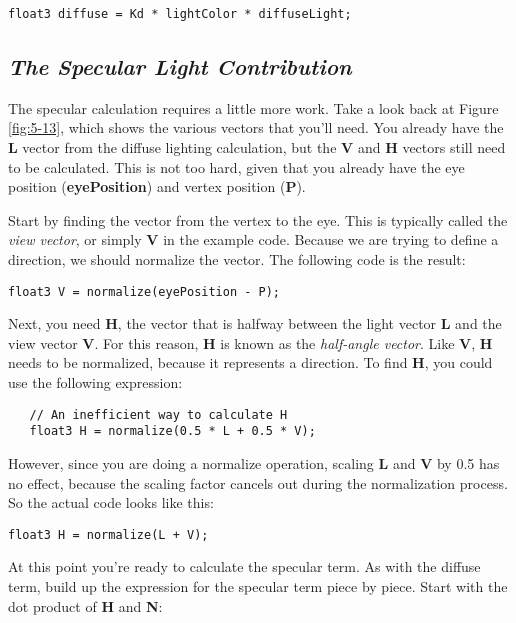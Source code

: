 \documentclass[../main.tex]{subfiles}
\begin{document}
\FloatBarrier
\begin{lstlisting}
float3 diffuse = Kd * lightColor * diffuseLight;
\end{lstlisting}
\FloatBarrier

\subsection*{\textit{The Specular Light Contribution}}

The specular calculation requires a little more work. Take a look back at Figure \ref{fig:5-13}, which shows the various vectors that you'll need. You already have the \textbf{L} vector from the diffuse lighting calculation, but the \textbf{V} and \textbf{H} vectors still need to be calculated. This is not too hard, given that you already have the eye position (\textbf{eyePosition}) and vertex position (\textbf{P}).

Start by finding the vector from the vertex to the eye. This is typically called the \textit{view vector}, or simply \textbf{V} in the example code. Because we are trying to define a direction, we should normalize the vector. The following code is the result:

\FloatBarrier
\begin{lstlisting}
float3 V = normalize(eyePosition - P);
\end{lstlisting}
\FloatBarrier

Next, you need \textbf{H}, the vector that is halfway between the light vector \textbf{L} and the view vector \textbf{V}. For this reason, \textbf{H} is known as the \textit{half-angle vector}. Like \textbf{V}, \textbf{H} needs to be normalized, because it represents a direction. To find \textbf{H}, you could use the following expression:

\FloatBarrier
\begin{lstlisting}
   // An inefficient way to calculate H
   float3 H = normalize(0.5 * L + 0.5 * V);
\end{lstlisting}
\FloatBarrier

However, since you are doing a normalize operation, scaling \textbf{L} and \textbf{V} by 0.5 has no effect, because the scaling factor cancels out during the normalization process. So the actual code looks like this:

\FloatBarrier
\begin{lstlisting}
float3 H = normalize(L + V);
\end{lstlisting}
\FloatBarrier

At this point you're ready to calculate the specular term. As with the diffuse term, build up the expression for the specular term piece by piece. Start with the dot product of \textbf{H} and \textbf{N}:
\end{document}
